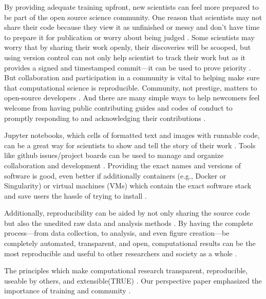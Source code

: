 By providing adequate training upfront, new scientists can feel more prepared to be part of the open source science community.
One reason that scientists may not share their code because they view it as unfinished or messy and don't have time to prepare it for publication or worry about being judged \cite{Irving2016}.
Some scientists may worry that by sharing their work openly, their discoveries will be scooped, but using version control can not only help scientist to track their work but as it provides a signed and timestamped commit---it can be used to prove priority \cite{Blischak2016}. 
But collaboration and participation in a community is vital to helping make sure that computational science is reproducible. 
Community, not prestige, matters to open-source developers \cite{Smirnova2022}.
And there are many simple ways to help newcomers feel welcome from having public contributing guides and codes of conduct to promptly responding to and acknowledging their contributions \cite{Sholler2019}.

Jupyter notebooks, which cells of formatted text and images with runnable code, can be a great way for scientists to show and tell the story of their work \cite{Rule2019a}.
Tools like github issues/project boards can be used to manage and organize collaboration and development \cite{Gentzkow2014}.
Providing the exact names and versions of software is good, even better if additionally containers (e.g., Docker or Singularity) or virtual machines (VMs) which contain the exact software stack and save users the hassle of trying to install \cite{Cito2016, Shirts2008a}.

Additionally, reproducibility can be aided by not only sharing the source code but also the unedited raw data and analysis methods \cite{Miyakawa2020}. 
By having the complete process---from data collection, to analysis, and even figure creation---be completely automated, transparent, and open, computational results can be the most reproducible and useful to other researchers and society as a whole \cite{Taylor2019, Donoho2009}.

The principles which make computational research transparent, reproducible, useable by others, and extensible(TRUE) \cite{Thompson2020}.
Our perspective paper emphasized the importance of training and community \cite{Jankowski2019}.

